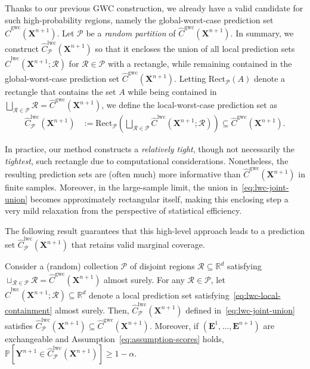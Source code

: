 {Thanks to our previous GWC construction, we already have a valid candidate for such high-probability regions, namely the global-worst-case prediction set $\hat{C}^{\mathrm{gwc}}(\mathbf{X}^{n+1})$. Let $\mathcal{P}$ be a {\em random partition} of $\hat{C}^{\mathrm{gwc}}(\mathbf{X}^{n+1})$. In summary, we construct $\hat{C}^{\mathrm{lwc}}_{\mathcal{P}}(\mathbf{X}^{n+1})$ so that it encloses the union of all local prediction sets $\hat{C}^\mathrm{lwc}(\mathbf{X}^{n+1}; \mathcal{R})$ for $\mathcal{R} \in \mathcal{P}$ with a rectangle, while remaining contained in the global-worst-case prediction set $\hat{C}^{\mathrm{gwc}}(\mathbf{X}^{n+1})$. Letting $\mathrm{Rect}_{\mathcal{P}}(A)$ denote a rectangle that contains the set $A$ while being contained in $\bigsqcup_{\mathcal{R} \in \mathcal{P}}\mathcal{R} = \hat{C}^{\mathrm{gwc}}(\mathbf{X}^{n+1})$, we define the local-worst-case prediction set as
\begin{equation}
    \begin{aligned}
        \hat{C}^{\mathrm{lwc}}_\mathcal{P}(\mathbf{X}^{n+1}) &:= \mathrm{Rect}_{\mathcal{P}}\left(\bigsqcup_{\mathcal{R} \in \mathcal{P}} \hat{C}^\mathrm{lwc}(\mathbf{X}^{n+1}; \mathcal{R})\right) \subseteq \hat{C}^{\mathrm{gwc}}(\mathbf{X}^{n+1}).
    \label{eq:lwc-joint-union}
    \end{aligned}
\end{equation}
}

In practice, our method constructs a {\em relatively tight}, though not necessarily the {\em tightest}, such rectangle due to computational considerations. Nonetheless, the resulting prediction sets are (often much) more informative than $\hat{C}^{\mathrm{gwc}}(\mathbf{X}^{n+1})$ in finite samples. Moreover, in the large-sample limit, the union in~\eqref{eq:lwc-joint-union} becomes approximately rectangular itself, making this enclosing step a very mild relaxation from the perspective of statistical efficiency.

The following result guarantees that this high-level approach leads to a prediction set $\hat{C}^{\mathrm{lwc}}_\mathcal{P}(\mathbf{X}^{n+1})$ that retains valid marginal coverage.
\begin{proposition}
Consider a (random) collection $\mathcal{P}$ of disjoint regions $\mathcal{R} \subseteq \mathbb{R}^d$ satisfying $\sqcup_{\mathcal{R} \in \mathcal{P} } \mathcal{R} = \hat{C}^{\mathrm{gwc}}(\mathbf{X}^{n+1})$ almost surely.
For any $\mathcal{R} \in \mathcal{P}$, let $\hat{C}^\mathrm{lwc}(\mathbf{X}^{n+1}; \mathcal{R}) \subseteq \mathbb{R}^d$ denote a local prediction set satisfying~\eqref{eq:lwc-local-containment} almost surely.
Then, $\hat{C}^{\mathrm{lwc}}_\mathcal{P}(\mathbf{X}^{n+1})$ defined in~\eqref{eq:lwc-joint-union}  satisfies $\hat{C}^{\mathrm{lwc}}_\mathcal{P}(\mathbf{X}^{n+1}) \subseteq \hat{C}^{\mathrm{gwc}}(\mathbf{X}^{n+1})$.
Moreover, if $(\mathbf{E}^1,\ldots,\mathbf{E}^{n+1})$ are exchangeable and Assumption~\ref{eq:assumption-scores} holds, $\mathbb{P}[ \mathbf{Y}^{n+1} \in \hat{C}^{\mathrm{lwc}}_\mathcal{P}(\mathbf{X}^{n+1}) ] \ge 1 - \alpha$.
\label{prop:lwc-approximation}
\end{proposition}

